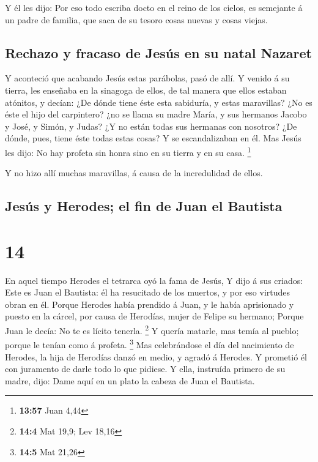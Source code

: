 Y él les dijo: Por eso todo escriba docto en el reino de
los cielos, es semejante á un padre de familia, que saca de su tesoro
cosas nuevas y cosas viejas.

\hypertarget{rechazo-y-fracaso-de-jesuxfas-en-su-natal-nazaret}{%
\subsection{Rechazo y fracaso de Jesús en su natal
Nazaret}\label{rechazo-y-fracaso-de-jesuxfas-en-su-natal-nazaret}}

 Y aconteció que acabando Jesús estas parábolas, pasó de
allí.  Y venido á su tierra, les enseñaba en la sinagoga
de ellos, de tal manera que ellos estaban atónitos, y decían: ¿De dónde
tiene éste esta sabiduría, y estas maravillas?  ¿No es
éste el hijo del carpintero? ¿no se llama su madre María, y sus hermanos
Jacobo y José, y Simón, y Judas?  ¿Y no están todas sus
hermanas con nosotros? ¿De dónde, pues, tiene éste todas estas cosas?
 Y se escandalizaban en él. Mas Jesús les dijo: No hay
profeta sin honra sino en su tierra y en su casa. \footnote{\textbf{13:57}
  Juan 4,44}

 Y no hizo allí muchas maravillas, á causa de la
incredulidad de ellos.

\hypertarget{jesuxfas-y-herodes-el-fin-de-juan-el-bautista}{%
\subsection{Jesús y Herodes; el fin de Juan el
Bautista}\label{jesuxfas-y-herodes-el-fin-de-juan-el-bautista}}

\hypertarget{section-13}{%
\section{14}\label{section-13}}

 En aquel tiempo Herodes el tetrarca oyó la fama de Jesús,
 Y dijo á sus criados: Este es Juan el Bautista: él ha
resucitado de los muertos, y por eso virtudes obran en él.
 Porque Herodes había prendido á Juan, y le había
aprisionado y puesto en la cárcel, por causa de Herodías, mujer de
Felipe su hermano;  Porque Juan le decía: No te es lícito
tenerla. \footnote{\textbf{14:4} Mat 19,9; Lev 18,16}  Y
quería matarle, mas temía al pueblo; porque le tenían como á profeta.
\footnote{\textbf{14:5} Mat 21,26}  Mas celebrándose el
día del nacimiento de Herodes, la hija de Herodías danzó en medio, y
agradó á Herodes.  Y prometió él con juramento de darle
todo lo que pidiese.  Y ella, instruída primero de su
madre, dijo: Dame aquí en un plato la cabeza de Juan el Bautista.

